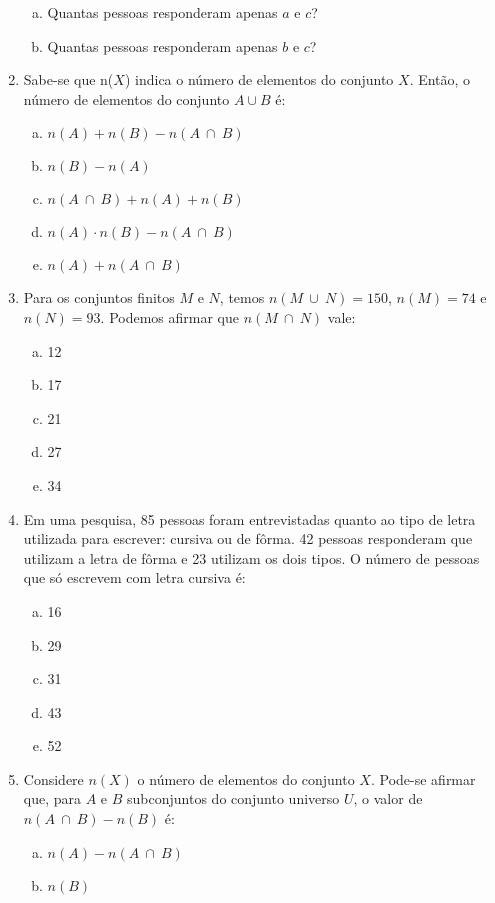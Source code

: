 \documentclass[a4paper,14pt]{article}
\begin{document}
\begin{multicols}{2}
\begin{enumerate}
\begin{enumerate}[a)]
    		\item Quantas pessoas responderam apenas $a$ e $c$?
    		\item Quantas pessoas responderam apenas $b$ e $c$?
    	\end{enumerate}
    	\item Sabe-se que n($X$) indica o número de elementos do conjunto $X$. Então, o número de elementos do conjunto $A \cup B$ é:
    	\begin{enumerate}[a)]
    		\item $n(A) + n(B) - n(A~\cap~B)$
    		\item $n(B) - n(A)$
    		\item $n(A~\cap~B) + n(A) + n(B)$
    		\item $n(A) \cdot n(B) - n(A~\cap~B)$
    		\item $n(A) + n(A~\cap~B)$
    	\end{enumerate}
    	\item Para os conjuntos finitos $M$ e $N$, temos $n(M~\cup~N) = 150$, $n(M) = 74$ e $n(N) = 93$. Podemos afirmar que $n(M~\cap~N)$ vale:
    	\begin{enumerate}[a)]
    		\item 12
    		\item 17
    		\item 21
    		\item 27
    		\item 34
    	\end{enumerate}
    	\item Em uma pesquisa, 85 pessoas foram entrevistadas quanto ao tipo de letra utilizada para escrever: cursiva ou de fôrma. 42 pessoas responderam que utilizam a letra de fôrma e 23 utilizam os dois tipos. O número de pessoas que só escrevem com letra cursiva é:
    	\begin{enumerate}[a)]
    		\item 16
    		\item 29
    		\item 31
    		\item 43
    		\item 52
    	\end{enumerate}
    	\item Considere $n(X)$ o número de elementos do conjunto $X$. Pode-se afirmar que, para $A$ e $B$ subconjuntos do conjunto universo $U$, o valor de $n(A~\cap~B) - n(B)$ é:
    	\begin{enumerate}[a)]
    		\item $n(A) - n(A~\cap~B)$
    		\item $n(B)$

\end{enumerate}
\end{enumerate}
\end{multicols}
\end{document}
